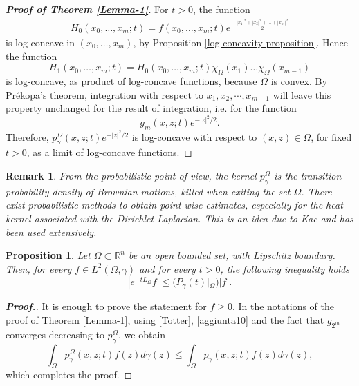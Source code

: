 \documentclass[12pt]{amsart}
\newtheorem{proposition}[theorem]{Proposition}
\newtheorem{remark}[theorem]{Remark}
\newcommand{\R}{\mathbb R}
\newcommand{\1}{\mathbf 1}
\begin{document}
\begin{proof}[\bf Proof of Theorem \ref{Lemma-1}]
For $t>0$, the function
\begin{eqnarray*}
H_0(x_0,\dots,x_m;t)=
f(x_0,\dots,x_m;t) e^{-\frac{|x_1|^2+|x_2|^2+\dots+|x_m|^2}{2}}
\end{eqnarray*}
is log-concave in $(x_0,\dots,x_m)$, by Proposition \ref{log-concavity proposition}. Hence the function
\begin{equation*}
H_1(x_0,\dots,x_m;t)=H_0(x_0,\dots,x_m;t)\chi_\Omega(x_1)\dots\chi_\Omega(x_{m-1})
\end{equation*}
is log-concave, as product of log-concave functions, because $\Omega$ is convex. By Pr\'{e}kopa's theorem, integration with respect to $x_1,x_2,\cdots,x_{m-1}$ will leave this property unchanged for the result of integration, i.e. for the function
$$
g_m(x,z;t)e^{-|z|^2/2}.
$$
Therefore, $p^\Omega_{\gamma}(x,z;t)e^{-|z|^2/2}$ is log-concave with respect to $(x,z)\in \Omega$, for fixed $t>0$, as a limit of log-concave functions.
\end{proof}

\begin{remark} From the probabilistic point of view, the kernel $p_\gamma^\Omega$ is the transition probability density of Brownian motions, killed when exiting the set $\Omega$. There exist probabilistic methods to obtain point-wise estimates, especially for the heat kernel associated with the Dirichlet Laplacian. This is an idea due to Kac \cite{Kac1966,Kac1950} and has been used extensively.
\end{remark}


\begin{proposition}\label{p3} Let $\Omega \subset \R^n$ be an open bounded set, with Lipschitz boundary. Then, for every $f\in L^2(\Omega,\gamma)$ and for every $t>0$, the following inequality holds
\[
|e^{-tL_\Omega}f| \leq (P_\gamma (t)|_\Omega)|f|.
\]
\end{proposition}

\begin{proof}[\bf Proof.] It is enough to prove the statement for $f\geq 0$. In the notations of the proof of Theorem \ref{Lemma-1}, using \eqref{Totter}, \eqref{aggiunta10} and the fact that $g_{2^m}$ converges decreasing to $p_\gamma^\Omega$, we obtain
\[
\int_\Omega p_\gamma^{\Omega}(x,z;t) f(z)d\gamma(z)\leq \int_\Omega p_\gamma(x,z;t)f(z)d\gamma(z),
\]
which completes the proof.
\end{proof}
\end{document}
